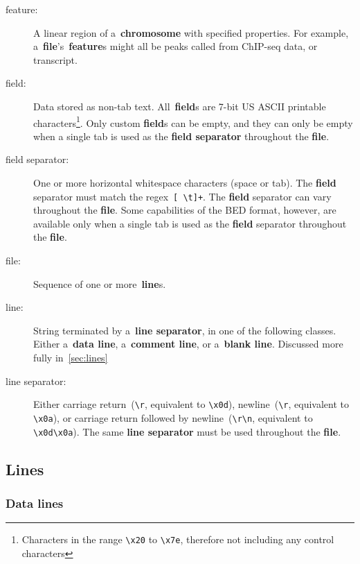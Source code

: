 \documentclass[11pt]{article}
\begin{document}
\begin{description}
\item[feature:]
  A linear region of a~\textbf{chromosome} with specified properties.
  For example, a~\textbf{file}'s~\textbf{feature}s might all be peaks called from ChIP-seq data, or transcript.

\item[field:]
  Data stored as non-tab text.
  All~\textbf{field}s are 7-bit US \ac{ASCII} printable characters\footnote{Characters in the range \texttt{{\textbackslash}x20} to \texttt{{\textbackslash}x7e}, therefore not including any control characters}.
  Only custom \textbf{field}s can be empty, and they can only be empty when a single tab is used as the \textbf{field separator} throughout the \textbf{file}.

\item[field separator:]
  One or more horizontal whitespace characters (space or tab).
  The \textbf{field} separator must match the \ac{regex}~\texttt{[ {\textbackslash}t]+}.
  The \textbf{field} separator can vary throughout the \textbf{file}.
  Some capabilities of the \ac{BED} format, however, are available only when a single tab is used as the \textbf{field} separator throughout the \textbf{file}.

\item[file:]
  Sequence of one or more~\textbf{line}s.

\item[line:]
  String terminated by a~\textbf{line separator}, in one of the following classes.
  Either a~\textbf{data line}, a~\textbf{comment line}, or a~\textbf{blank line}.
  Discussed more fully in~\autoref{sec:lines}

\item[line separator:]
  Either carriage return~(\texttt{{\textbackslash}r}, equivalent to \texttt{{\textbackslash}x0d}), newline~(\texttt{{\textbackslash}r}, equivalent to \texttt{{\textbackslash}x0a}), or carriage return followed by newline~(\texttt{{\textbackslash}r{\textbackslash}n}, equivalent to \texttt{{\textbackslash}x0d{\textbackslash}x0a}).
  The same \textbf{line separator} must be used throughout the \textbf{file}.
\end{description}

\subsection{Lines}\label{sec:lines}

\subsubsection{Data lines}
\end{document}
